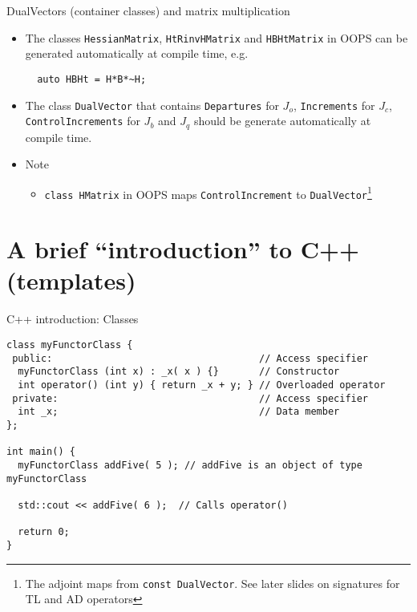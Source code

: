 \documentclass[9pt]{beamer}
\begin{document}
\begin{frame}[fragile]{DualVectors (container classes) and matrix multiplication}

\begin{itemize}
  \item The classes \lstinline|HessianMatrix|, \lstinline|HtRinvHMatrix| and \lstinline|HBHtMatrix| in OOPS can be generated automatically at compile time, e.g.

    \lstinline|  auto HBHt = H*B*~H;|
  \item The class \lstinline|DualVector| that contains \lstinline|Departures| for $J_o$, \lstinline|Increments| for $J_c$, \lstinline|ControlIncrements| for $J_b$ and $J_q$ should be generate automatically at compile time.
  \item Note 
    \begin{itemize} 
      \item \lstinline|class HMatrix| in OOPS maps \lstinline|ControlIncrement| to  \lstinline|DualVector|\footnote{The adjoint maps from \lstinline|const DualVector|. See later slides on signatures for TL and AD operators}
\end{itemize} 
\end{itemize}
\end{frame}

\section{A brief ``introduction'' to C++ (templates)}
\begin{frame}[fragile]{C++ introduction: Classes}

\begin{lstlisting}
class myFunctorClass {
 public:                                    // Access specifier
  myFunctorClass (int x) : _x( x ) {}       // Constructor
  int operator() (int y) { return _x + y; } // Overloaded operator
 private:                                   // Access specifier
  int _x;                                   // Data member
};

int main() {
  myFunctorClass addFive( 5 ); // addFive is an object of type myFunctorClass

  std::cout << addFive( 6 );  // Calls operator()

  return 0;
}
\end{lstlisting}

\end{frame}
\end{document}
